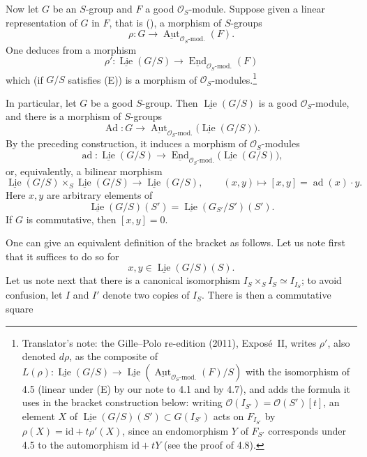 %
Now let \(G\) be an \(S\)-group and \(F\) a good
\(\mathcal O_S\)-module. Suppose given a linear representation of
\(G\) in \(F\), that is (), a morphism of \(S\)-groups
\[
 \rho:G\longrightarrow
 \underline{\operatorname{Aut}}_{\mathcal O_S\text{-mod.}}(F).
\]
One deduces from  a morphism
\[
 \rho':\underline{\operatorname{Lie}}(G/S)
 \longrightarrow
 \underline{\operatorname{End}}_{\mathcal O_S\text{-mod.}}(F)
\]
which (if \(G/S\) satisfies (E)) is a morphism of
\(\mathcal O_S\)-modules.\footnote{Translator's note: the Gille--Polo
re-edition (2011), Expos\'e~II, writes \(\rho'\), also denoted \(d\rho\), as
the composite of \(L(\rho)\colon\underline{\operatorname{Lie}}(G/S)\to
\underline{\operatorname{Lie}}(\underline{\operatorname{Aut}}_{\mathcal O_S\text{-mod.}}(F)/S)\)
with the isomorphism of 4.5 (linear under (E) by our note to 4.1 and by
4.7), and adds the formula it uses in the bracket construction below:
writing \(\mathcal O(I_{S'})=\mathcal O(S')[t]\), an element \(X\) of
\(\underline{\operatorname{Lie}}(G/S)(S')\subset G(I_{S'})\) acts on
\(F_{I_{S'}}\) by \(\rho(X)=\mathrm{id}+t\rho'(X)\), since an endomorphism
\(Y\) of \(F_{S'}\) corresponds under 4.5 to the automorphism
\(\mathrm{id}+tY\) (see the proof of 4.8).}

%
In particular, let \(G\) be a good \(S\)-group. Then
\(\underline{\operatorname{Lie}}(G/S)\) is a good
\(\mathcal O_S\)-module, and there is a morphism of \(S\)-groups
\[
 \operatorname{Ad}:G\longrightarrow
 \underline{\operatorname{Aut}}_{\mathcal O_S\text{-mod.}}
   \bigl(\underline{\operatorname{Lie}}(G/S)\bigr).
\]
By the preceding construction, it induces a morphism of \(\mathcal O_S\)-modules
\[
 \operatorname{ad}:
 \underline{\operatorname{Lie}}(G/S)
 \longrightarrow
 \underline{\operatorname{End}}_{\mathcal O_S\text{-mod.}}
   \bigl(\underline{\operatorname{Lie}}(G/S)\bigr),
\]
or, equivalently, a bilinear morphism
\[
 \underline{\operatorname{Lie}}(G/S)
 \times_S
 \underline{\operatorname{Lie}}(G/S)
 \longrightarrow
 \underline{\operatorname{Lie}}(G/S),
 \qquad
 (x,y)\longmapsto[x,y]=\operatorname{ad}(x)\cdot y.
\]
Here \(x,y\) are arbitrary elements of
\[
 \underline{\operatorname{Lie}}(G/S)(S')
 =
 \underline{\operatorname{Lie}}(G_{S'}/S')(S').
\]
If \(G\) is commutative, then \([x,y]=0\).

%
One can give an equivalent definition of the bracket as follows. Let us
note first that it suffices to do so for
\[
 x,y\in\underline{\operatorname{Lie}}(G/S)(S).
\]
Let us note next that there is a canonical isomorphism
\(I_S\times_SI_S\simeq I_{I_S}\); to avoid confusion, let \(I\) and
\(I'\) denote two copies of \(I_S\). There is then a commutative square


